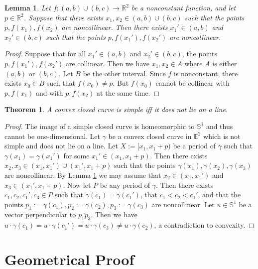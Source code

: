 \documentclass{amsart}
\newtheorem{lemma}[proposition]{Lemma}
\newtheorem{theorem}[proposition]{Theorem}
\theoremstyle{definition}
\theoremstyle{remark}
\begin{document}
\begin{lemma}
    \label{lem}
    Let $f:(a,b)\cup(b,c)\to\mathbb{R}^2$ be a
    nonconstant function, and let $p\in\mathbb{R}^2$.
    Suppose that there exists $x_1,x_2\in(a,b)\cup(b,c)$ such that
    the points $p,f(x_1),f(x_2)$ are noncollinear.
    Then there exists $x_1'\in(a,b)$ and $x_2'\in(b,c)$ such that
    the points $p,f(x_1'),f(x_2')$ are noncollinear.
\end{lemma}

\begin{proof}
    Suppose that for all $x_1'\in(a,b)$ and $x_2'\in(b,c)$,
    the points $p,f(x_1'),f(x_2')$ are collinear.
    Then we have $x_1,x_2\in A$ where
    $A$ is either $(a,b)$ or $(b,c)$. Let $B$ be the other interval.
    Since $f$ is nonconstant, there exists $x_0\in B$
    such that $f(x_0)\ne p$. But $f(x_0)$ cannot be collinear
    with $p,f(x_1)$ and with $p,f(x_2)$ at the same time.
\end{proof}

\begin{theorem}
    \label{thm:main}
    A convex closed curve is simple iff it does not lie on a line.
\end{theorem}

\begin{proof}
    The image of a simple closed curve is homeomorphic to
    $\mathbb{S}^1$ and thus cannot be one-dimensional.
    Let $\gamma$ be a convex closed curve in $\mathbb{E}^2$
    which is not simple and does not lie on a line.
    Let $X:=[x_1,x_1+p)$ be a period of $\gamma$ such that
    $\gamma(x_1)=\gamma(x_1')$ for some $x_1'\in(x_1,x_1+p)$.
    Then there exists $x_2,x_3\in(x_1,x_1')\cup(x_1',x_1+p)$
    such that the points $\gamma(x_1),\gamma(x_2),\gamma(x_3)$ are
    noncollinear. By Lemma \ref{lem} we may assume that
    $x_2\in(x_1,x_1')$ and $x_3\in(x_1',x_1+p)$.
    Now let $P$ be any period of $\gamma$. Then there exists
    $c_1,c_2,c_1',c_3\in P$ such that $\gamma(c_1)=\gamma(c_1')$,
    that $c_1<c_2<c_1'$, and that the points
    $p_1:=\gamma(c_1),p_2:=\gamma(c_2),p_3:=\gamma(c_3)$ are noncollinear.
    Let $u\in\mathbb{S}^1$ be a vector perpendicular to
    $\overline{p_1p_3}$. Then we have
    $u\cdot\gamma(c_1)=u\cdot\gamma(c_1')=u\cdot\gamma(c_3)
        \ne u\cdot\gamma(c_2)$, a contradiction to convexity.
\end{proof}

\section{Geometrical Proof}
\label{sec:geometrical_proof}
\end{document}
